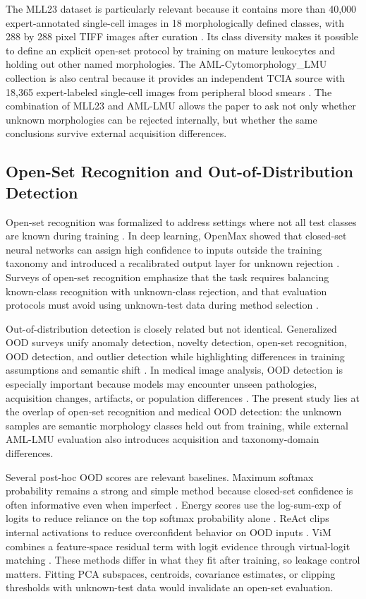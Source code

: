 The MLL23 dataset is particularly relevant because it contains more than 40,000 expert-annotated single-cell images in 18 morphologically defined classes, with 288 by 288 pixel TIFF images after curation \cite{mll23_nature_2025,mll23_zenodo_2024}. Its class diversity makes it possible to define an explicit open-set protocol by training on mature leukocytes and holding out other named morphologies. The AML-Cytomorphology\_LMU collection is also central because it provides an independent TCIA source with 18,365 expert-labeled single-cell images from peripheral blood smears \cite{aml_lmu_tcia_2019}. The combination of MLL23 and AML-LMU allows the paper to ask not only whether unknown morphologies can be rejected internally, but whether the same conclusions survive external acquisition differences.

\subsection{Open-Set Recognition and Out-of-Distribution Detection}

Open-set recognition was formalized to address settings where not all test classes are known during training \cite{scheirer2013_open_set}. In deep learning, OpenMax showed that closed-set neural networks can assign high confidence to inputs outside the training taxonomy and introduced a recalibrated output layer for unknown rejection \cite{bendale2016_openmax}. Surveys of open-set recognition emphasize that the task requires balancing known-class recognition with unknown-class rejection, and that evaluation protocols must avoid using unknown-test data during method selection \cite{geng2021_osr_survey}.

Out-of-distribution detection is closely related but not identical. Generalized OOD surveys unify anomaly detection, novelty detection, open-set recognition, OOD detection, and outlier detection while highlighting differences in training assumptions and semantic shift \cite{yang2024_generalized_ood}. In medical image analysis, OOD detection is especially important because models may encounter unseen pathologies, acquisition changes, artifacts, or population differences \cite{hong2024_medical_ood_survey}. The present study lies at the overlap of open-set recognition and medical OOD detection: the unknown samples are semantic morphology classes held out from training, while external AML-LMU evaluation also introduces acquisition and taxonomy-domain differences.

Several post-hoc OOD scores are relevant baselines. Maximum softmax probability remains a strong and simple method because closed-set confidence is often informative even when imperfect \cite{hendrycks2017_msp}. Energy scores use the log-sum-exp of logits to reduce reliance on the top softmax probability alone \cite{liu2020_energy}. ReAct clips internal activations to reduce overconfident behavior on OOD inputs \cite{sun2021_react}. ViM combines a feature-space residual term with logit evidence through virtual-logit matching \cite{wang2022_vim}. These methods differ in what they fit after training, so leakage control matters. Fitting PCA subspaces, centroids, covariance estimates, or clipping thresholds with unknown-test data would invalidate an open-set evaluation.

